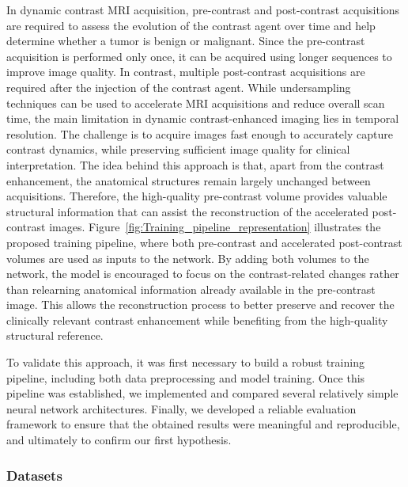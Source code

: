 \documentclass[12pt]{article}
\begin{document}
In dynamic contrast MRI acquisition, pre-contrast and post-contrast acquisitions are required to assess the evolution of the contrast agent over time and help determine whether a tumor is benign or malignant. 
Since the pre-contrast acquisition is performed only once, it can be acquired using longer sequences to improve image quality.
In contrast, multiple post-contrast acquisitions are required after the injection of the contrast agent.
While undersampling techniques can be used to accelerate MRI acquisitions and reduce overall scan time, the main limitation in dynamic contrast-enhanced imaging lies in temporal resolution. 
The challenge is to acquire images fast enough to accurately capture contrast dynamics, while preserving sufficient image quality for clinical interpretation.
The idea behind this approach is that, apart from the contrast enhancement, the anatomical structures remain largely unchanged between acquisitions.
Therefore, the high-quality pre-contrast volume provides valuable structural information that can assist the reconstruction of the accelerated post-contrast images.
Figure~\ref{fig:Training_pipeline_representation} illustrates the proposed training pipeline, where both pre-contrast and accelerated post-contrast volumes are used as inputs to the network.
By adding both volumes to the network, the model is encouraged to focus on the contrast-related changes rather than relearning anatomical information already available in the pre-contrast image. 
This allows the reconstruction process to better preserve and recover the clinically relevant contrast enhancement while benefiting from the high-quality structural reference.
\vspace{0.5cm}

To validate this approach, it was first necessary to build a robust training pipeline, including both data preprocessing and model training.
Once this pipeline was established, we implemented and compared several relatively simple neural network architectures. 
Finally, we developed a reliable evaluation framework to ensure that the obtained results were meaningful and reproducible, and ultimately to confirm our first hypothesis.

\subsubsection{Datasets}
\mbox{}\\
\end{document}
